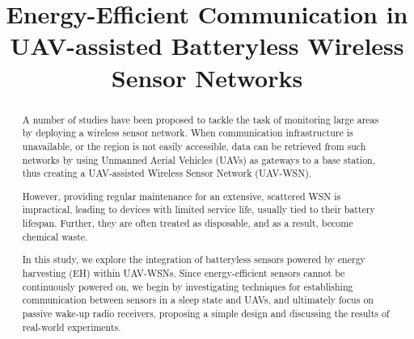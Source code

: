 \documentclass[conference]{IEEEtran}
\begin{document}
\title{Energy-Efficient Communication in UAV-assisted Batteryless Wireless Sensor Networks}

\author{
  \and
  \and
  \and
}

\maketitle

\begin{abstract}
  A number of studies have been proposed to tackle the task of monitoring large areas by deploying a wireless sensor network. When communication infrastructure is unavailable, or the region is not easily accessible, data can be retrieved from such networks by using Unmanned Aerial Vehicles (UAVs) as gateways to a base station, thus creating a UAV-assisted Wireless Sensor Network (UAV-WSN).

  However, providing regular maintenance for an extensive, scattered WSN is impractical, leading to devices with limited service life, usually tied to their battery lifespan. Further, they are often treated as disposable, and as a result, become chemical waste.

  In this study, we explore the integration of batteryless sensors powered by energy harvesting (EH) within UAV-WSNs. Since energy-efficient sensors cannot be continuously powered on, we begin by investigating techniques for establishing communication between sensors in a sleep state and UAVs, and ultimately focus on passive wake-up radio receivers, proposing a simple design and discussing the results of real-world experiments.
\end{abstract}
\end{document}
